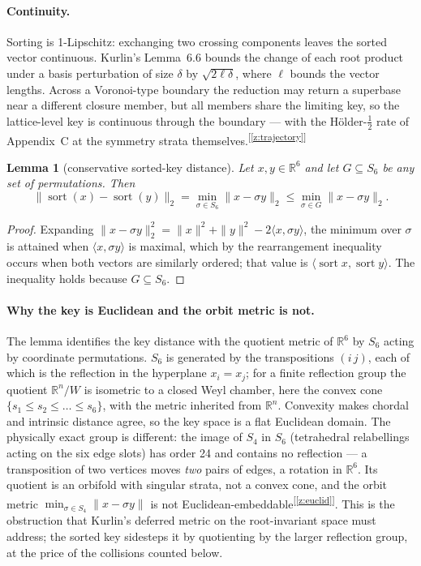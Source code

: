 \documentclass[11pt]{article}
\newtheorem{lemma}{Lemma}[section]
\newcommand{\chk}[1]{\textsuperscript{[\ref{#1}]}}
\begin{document}
\paragraph{Continuity.}
Sorting is 1-Lipschitz: exchanging two crossing components leaves the sorted vector continuous. Kurlin's Lemma~6.6 bounds the change of each root product under a basis perturbation of size $\delta$ by $\sqrt{2\ell\delta}$, where $\ell$ bounds the vector lengths. Across a Voronoi-type boundary the reduction may return a superbase near a different closure member, but all members share the limiting key, so the lattice-level key is continuous through the boundary --- with the H\"older-$\tfrac12$ rate of Appendix~C at the symmetry strata themselves.\chk{z:trajectory}

\begin{lemma}[conservative sorted-key distance]
\label{lem:lb}
Let $x,y\in\mathbb R^6$ and let $G\subseteq S_6$ be any set of permutations. Then
\[
\|\operatorname{sort}(x)-\operatorname{sort}(y)\|_2=\min_{\sigma\in S_6}\|x-\sigma y\|_2\le\min_{\sigma\in G}\|x-\sigma y\|_2 .
\]
\end{lemma}
\begin{proof}
Expanding $\|x-\sigma y\|_2^2=\|x\|^2+\|y\|^2-2\langle x,\sigma y\rangle$, the minimum over $\sigma$ is attained when $\langle x,\sigma y\rangle$ is maximal, which by the rearrangement inequality occurs when both vectors are similarly ordered; that value is $\langle\operatorname{sort}x,\operatorname{sort}y\rangle$. The inequality holds because $G\subseteq S_6$.
\end{proof}

\paragraph{Why the key is Euclidean and the orbit metric is not.}
The lemma identifies the key distance with the quotient metric of $\mathbb R^6$ by $S_6$ acting by coordinate permutations. $S_6$ is generated by the transpositions $(i\,j)$, each of which is the reflection in the hyperplane $x_i=x_j$; for a finite reflection group the quotient $\mathbb R^n/W$ is isometric to a closed Weyl chamber, here the convex cone $\{s_1\le s_2\le\dots\le s_6\}$, with the metric inherited from $\mathbb R^n$. Convexity makes chordal and intrinsic distance agree, so the key space is a flat Euclidean domain. The physically exact group is different: the image of $S_4$ in $S_6$ (tetrahedral relabellings acting on the six edge slots) has order 24 and contains no reflection --- a transposition of two vertices moves \emph{two} pairs of edges, a rotation in $\mathbb R^6$. Its quotient is an orbifold with singular strata, not a convex cone, and the orbit metric $\min_{\sigma\in S_4}\|x-\sigma y\|$ is not Euclidean-embeddable\chk{z:euclid}. This is the obstruction that Kurlin's deferred metric on the root-invariant space must address; the sorted key sidesteps it by quotienting by the larger reflection group, at the price of the collisions counted below.
\end{document}
